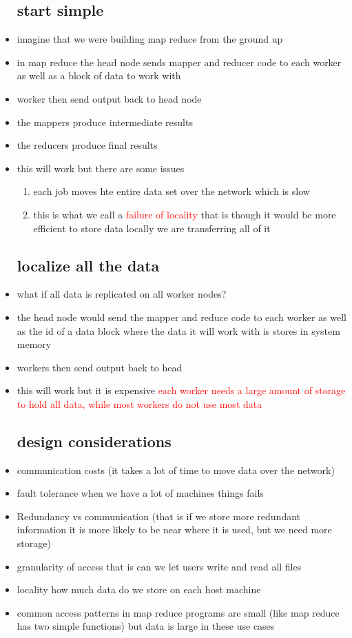 \documentclass{article}
\begin{document}
\begin{itemize}
\subsection*{start simple}
\item imagine that we were building map reduce from the ground up 
\item in map reduce the head node sends mapper and reducer code to each worker as well as a block of data to work with 
\item worker then send output back to head node 
\item the mappers produce intermediate results 
\item the reducers produce final results
\item this will work but there are some issues 
\begin{enumerate}
    \item each job moves hte entire data set over the network which is slow
    \item this is what we call a \textcolor{red}{failure of locality} that is though it would be more efficient to store data locally we are transferring all of it 
\end{enumerate}
\subsection*{localize all the data}
\item what if all data is replicated on all worker nodes? 
\item the head node would send the mapper and reduce code to each worker as well as the id of a data block where the data it will work with is stores in system memory 
\item workers then send output back to head 
\item this will work but it is expensive \textcolor{red}{each worker needs a large amount of storage to hold all data, while most workers do not use most data}
\subsection*{design considerations}
\item communication costs (it takes a lot of time to move data over the network)
\item fault tolerance when we have a lot of machines things fails
\item Redundancy vs communication (that is if we store more redundant information it is more likely to be near where it is used, but we need more storage)
\item granularity of access that is can we let users write and read all files
\item locality how much data do we store on each host machine 
\item common access patterns in map reduce programs are small (like map reduce has two simple functions) but data is large in these use cases

\end{itemize}
\end{document}
